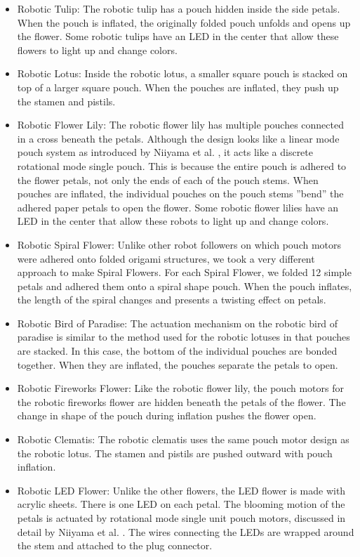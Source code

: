 \documentclass[letterpaper, 10 pt, conference]{ieeeconf}  %
\begin{document}
\begin{itemize}
	
	\item Robotic Tulip: The robotic tulip has a pouch hidden inside the side petals. When the pouch is inflated, the originally folded pouch unfolds and opens up the flower.  Some robotic tulips have an LED in the center that allow these flowers to light up and change colors.
	\item Robotic Lotus: Inside the robotic lotus, a smaller square pouch is stacked on top of a larger square pouch. When the pouches are inflated, they push up the stamen and pistils.  
	\item Robotic Flower Lily: The robotic flower lily has multiple pouches connected in a cross beneath the petals. Although the design looks like a linear mode pouch system as introduced by Niiyama et al. \cite{NiiyamaICRA2014}, it acts like a discrete rotational mode single pouch.  This is because the entire pouch is adhered to the flower petals, not only the ends of each of the pouch stems. When pouches are inflated, the individual pouches on the pouch stems ''bend'' the adhered paper petals to open the flower.  Some robotic flower lilies have an LED in the center that allow these robots to light up and change colors.
	\item Robotic Spiral Flower: Unlike other robot followers on which pouch motors were adhered onto folded origami structures, we took a very different approach to make Spiral Flowers. For each Spiral Flower, we folded 12 simple petals and adhered them onto a spiral shape pouch. When the pouch inflates, the length of the spiral changes and presents a twisting effect on petals.
	\item Robotic Bird of Paradise: The actuation mechanism on the robotic bird of paradise is similar to the method used for the robotic lotuses in that pouches are stacked. In this case, the bottom of the individual pouches are bonded together. When they are inflated, the pouches separate the petals to open.
	\item Robotic Fireworks Flower:  Like the robotic flower lily, the pouch motors for the robotic fireworks flower are hidden beneath the petals of the flower. The change in shape of the pouch during inflation pushes the flower open.
	\item Robotic Clematis: The robotic clematis uses the same pouch motor design as the robotic lotus. The stamen and pistils are pushed outward with pouch inflation.
	\item Robotic LED Flower: Unlike the other flowers, the LED flower is made with acrylic sheets. There is one LED on each petal. The blooming motion of the petals is actuated by rotational mode single unit pouch motors, discussed in detail by Niiyama et al. \cite{NiiyamaICRA2014}. The wires connecting the LEDs are wrapped around the stem and attached to the plug connector. 
	
\end{itemize}
\end{document}
